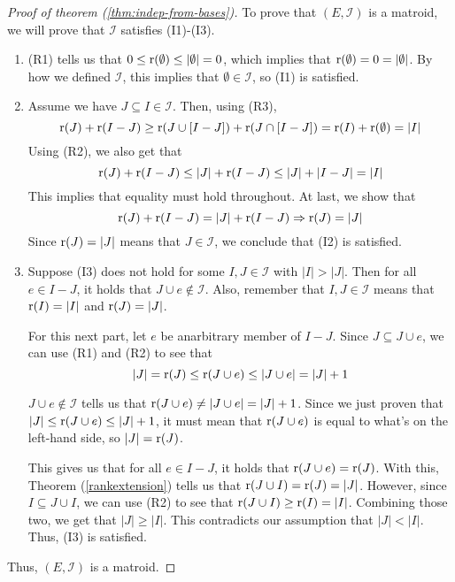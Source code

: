 \begin{proof}[Proof of theorem (\ref{thm:indep-from-bases})]
To prove that $(E,\mathcal{I})$ is a matroid, we will prove that $\mathcal{I}$ satisfies (I1)-(I3).
    \begin{enumerate}
        \item (R1) tells us that $0\leq\operatorname{r}(\emptyset)\leq|\emptyset|=0$, which implies that $\operatorname{r}(\emptyset)=0=|\emptyset|$. By how we defined $\mathcal{I}$, this implies that $\emptyset\in\mathcal{I}$, so (I1) is satisfied.
        \item Assume we have $J\subseteq I\in\mathcal{I}$. Then, using (R3),
        $$ \operatorname{r}(J)+\operatorname{r}(I-J) \geq \operatorname{r}(J\cup[I-J])+\operatorname{r}(J\cap[I-J]) = \operatorname{r}(I)+\operatorname{r}(\emptyset)=|I| $$
        Using (R2), we also get that
        $$ \operatorname{r}(J)+\operatorname{r}(I-J) \leq |J|+\operatorname{r}(I-J) \leq |J|+|I-J| = |I| $$
        This implies that equality must hold throughout. At last, we show that
        $$ \operatorname{r}(J)+\operatorname{r}(I-J) = |J|+\operatorname{r}(I-J) \Rightarrow \operatorname{r}(J)=|J| $$
        Since $\operatorname{r}(J)=|J|$ means that $J\in\mathcal{I}$, we conclude that (I2) is satisfied.
        
        \item Suppose (I3) does not hold for some $I,J\in\mathcal{I}$ with $|I|>|J|$. Then for all $e\in I-J$, it holds that $J\cup e\notin \mathcal{I}$. Also, remember that $I,J\in\mathcal{I}$ means that $\operatorname{r}(I)=|I|$ and $\operatorname{r}(J)=|J|$.

        For this next part, let $e$ be anarbitrary member of $I-J$. Since $J\subseteq J\cup e$, we can use (R1) and (R2) to see that
        $$ |J|=\operatorname{r}(J)\leq\operatorname{r}(J\cup e)\leq|J\cup e|=|J|+1 $$
        
        $J\cup e\notin \mathcal{I}$ tells us that $\operatorname{r}(J\cup e)\neq|J\cup e|=|J|+1$. Since we just proven that $|J|\leq\operatorname{r}(J\cup e)\leq|J|+1$, it must mean that $\operatorname{r}(J\cup e)$ is equal to what's on the left-hand side, so $|J|=\operatorname{r}(J)$.

        This gives us that for all $e\in I-J$, it holds that $\operatorname{r}(J\cup e)=\operatorname{r}(J)$. With this, Theorem (\ref{rankextension}) tells us that $\operatorname{r}(J\cup I)=\operatorname{r}(J)=|J|$. However, since $I\subseteq J\cup I$, we can use (R2) to see that $\operatorname{r}(J\cup I) \geq \operatorname{r}(I) = |I|$. Combining those two, we get that $|J|\geq|I|$. This contradicts our assumption that $|J|<|I|$. Thus, (I3) is satisfied.
    \end{enumerate}
    Thus, $(E,\mathcal{I})$ is a matroid.
\end{proof}


